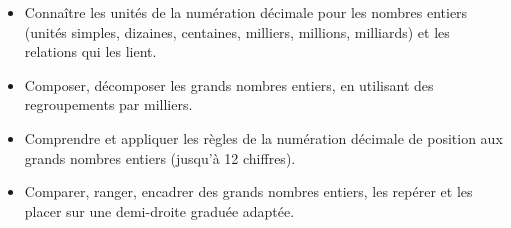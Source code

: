 \begin{prerequis}    
   \begin{itemize}                
        \item[\emoji{red-heart}] Connaître les unités de la numération décimale pour les nombres entiers (unités simples, dizaines, centaines, milliers, millions, milliards) et les relations qui les lient.
       \columnbreak       
       \item[\emoji{diamond-suit}] Composer, décomposer les grands nombres entiers, en utilisant des regroupements par milliers.
       \item[\emoji{diamond-suit}] Comprendre et appliquer les règles de la numération décimale de position aux grands nombres entiers (jusqu’à 12 chiffres).
       \item[\emoji{diamond-suit}] Comparer, ranger, encadrer des grands nombres entiers, les repérer et les placer sur une demi-droite graduée adaptée.
   \end{itemize}
\end{prerequis}